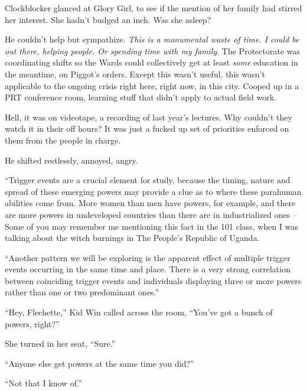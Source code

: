 Clockblocker glanced at Glory Girl, to see if the mention of her family had stirred her interest.  She hadn't budged an inch.  Was she asleep?



He couldn't help but sympathize. \emph{ This is a monumental waste of time.  I could be out there, helping people.  Or spending time with my family}.  The Protectorate was coordinating shifts so the Wards could collectively get at least \emph{some} education in the meantime, on Piggot's orders.  Except this wasn't useful, this wasn't applicable to the ongoing crisis right here, right now, in this city.  Cooped up in a PRT conference room, learning stuff that didn't apply to actual field work.



Hell, it was on videotape, a recording of last year's lectures.  Why couldn't they watch it in their off hours?  It was just a fucked up set of priorities enforced on them from the people in charge.



He shifted restlessly, annoyed, angry.



``Trigger events are a crucial element for study, because the timing, nature and spread of these emerging powers may provide a clue as to where these parahuman abilities come from.  More women than men have powers, for example, and there are more powers in undeveloped countries than there are in industrialized ones – Some of you may remember me mentioning this fact in the 101 class, when I was talking about the witch burnings in The People's Republic of Uganda.



``Another pattern we will be exploring is the apparent effect of multiple trigger events occurring in the same time and place.  There is a very strong correlation between coinciding trigger events and individuals displaying three or more powers rather than one or two predominant ones.''



``Hey, Flechette,'' Kid Win called across the room, ``You've got a bunch of powers, right?''



She turned in her seat, ``Sure.''



``Anyone else get powers at the same time you did?''



``Not that I know of.''



